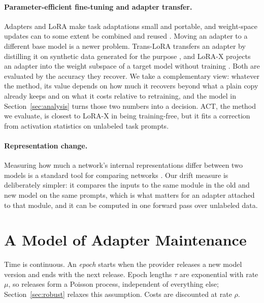 \documentclass[ijds,blindrev]{informs4}
\begin{document}
\paragraph{Parameter-efficient fine-tuning and adapter transfer.} Adapters \citep{houlsby2019parameter} and LoRA \citep{hu2022lora} make task adaptations small and portable, and weight-space updates can to some extent be combined and reused \citep{ilharco2023editing}. Moving an adapter to a different base model is a newer problem. Trans-LoRA transfers an adapter by distilling it on synthetic data generated for the purpose \citep{wang2024translora}, and LoRA-X projects an adapter into the weight subspace of a target model without training \citep{farhadzadeh2025lorax}. Both are evaluated by the accuracy they recover. We take a complementary view: whatever the method, its value depends on how much it recovers beyond what a plain copy already keeps and on what it costs relative to retraining, and the model in Section~\ref{sec:analysis} turns those two numbers into a decision. ACT, the method we evaluate, is closest to LoRA-X in being training-free, but it fits a correction from activation statistics on unlabeled task prompts.

\paragraph{Representation change.} Measuring how much a network's internal representations differ between two models is a standard tool for comparing networks \citep{kornblith2019similarity}. Our drift measure is deliberately simpler: it compares the inputs to the same module in the old and new model on the same prompts, which is what matters for an adapter attached to that module, and it can be computed in one forward pass over unlabeled data.

\section{A Model of Adapter Maintenance}\label{sec:model}

Time is continuous. An \emph{epoch} starts when the provider releases a new model version and ends with the next release. Epoch lengths $\tau$ are exponential with rate $\mu$, so releases form a Poisson process, independent of everything else; Section~\ref{sec:robust} relaxes this assumption. Costs are discounted at rate $\rho$.
\end{document}
